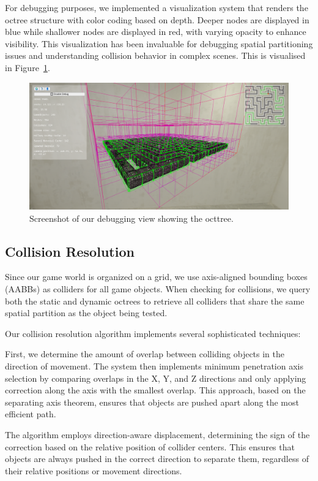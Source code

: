 \documentclass{article}
\begin{document}
For debugging purposes, we implemented a visualization system that renders the
octree structure with color coding based on depth. Deeper nodes are displayed
in blue while shallower nodes are displayed in red, with varying opacity to
enhance visibility. This visualization has been invaluable for debugging
spatial partitioning issues and understanding collision behavior in complex
scenes. This is visualised in Figure~\ref{fig:octree}.

\begin{figure}[H]
    \centering
    \includegraphics[width=\textwidth]{diagrams/octree.png}
    \caption{Screenshot of our debugging view showing the octtree.}
    \label{fig:octree}
\end{figure}

\subsection{Collision Resolution}
Since our game world is organized on a grid, we use axis-aligned bounding boxes
(AABBs) as colliders for all game objects. When checking for collisions, we
query both the static and dynamic octrees to retrieve all colliders that share
the same spatial partition as the object being tested.

Our collision resolution algorithm implements several sophisticated techniques:

First, we determine the amount of overlap between colliding objects in the
direction of movement. The system then implements minimum penetration axis
selection by comparing overlaps in the X, Y, and Z directions and only applying
correction along the axis with the smallest overlap. This approach, based on
the separating axis theorem, ensures that objects are pushed apart along the
most efficient path.

The algorithm employs direction-aware displacement, determining the sign of the
correction based on the relative position of collider centers. This ensures
that objects are always pushed in the correct direction to separate them,
regardless of their relative positions or movement directions.
\end{document}
